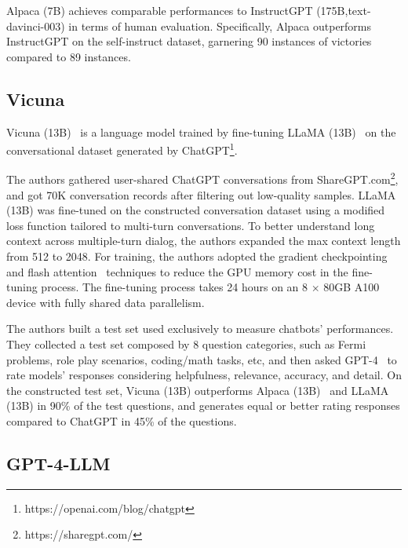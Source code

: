 \documentclass[11pt]{article}
\begin{document}
Alpaca (7B) achieves comparable performances to InstructGPT (175B,text-davinci-003) in terms  of human evaluation. Specifically, Alpaca outperforms InstructGPT on the self-instruct dataset, garnering 90 instances of victories compared to 89 instances.


\subsection{Vicuna}
Vicuna (13B)~\citep{chiang2023vicuna} is a language model trained by fine-tuning LLaMA (13B)~\citep{Touvron2023LLaMAOA} on the conversational dataset generated by ChatGPT\footnote{https://openai.com/blog/chatgpt}.

The authors gathered user-shared ChatGPT conversations from ShareGPT.com\footnote{https://sharegpt.com/}, and got 70K conversation records after filtering out low-quality samples. 
LLaMA (13B)  was fine-tuned on the constructed conversation dataset using a  modified loss function  tailored to multi-turn conversations.
To better understand long context across multiple-turn dialog, 
 the authors expanded the max context length from 512 to 2048. 
For training, the authors adopted the gradient checkpointing and flash attention~\citep{dao2022flashattention} techniques to reduce the GPU memory cost in the fine-tuning process. The fine-tuning process takes 24 hours on an 8 $\times$ 80GB A100 device with fully shared data parallelism.

The authors built a test set used exclusively to measure chatbots' performances. They collected a test set composed by 8 question categories, such as Fermi problems, role play scenarios, coding/math tasks, etc, and then asked GPT-4~\citep{OpenAI2023GPT4TR} to rate models' responses considering helpfulness, relevance, accuracy, and detail. 
On the constructed test set, 
Vicuna (13B) outperforms Alpaca (13B)~\citep{taori2023alpaca} and LLaMA (13B) in 90\% of the test questions, and generates equal or better rating responses compared to ChatGPT in 45\% of the questions.


\subsection{GPT-4-LLM}
\end{document}
